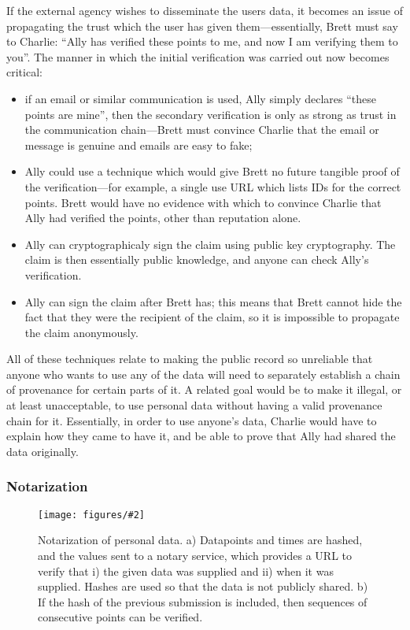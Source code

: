 \documentclass{IOS-Book-Article}     %
\newcommand{\fig}[3][0.9]{
\begin{figure}[tp]
\begin{center}
\texttt{[image: figures/\#2]}
\caption{#3}
\label{fig:#2}
\end{center}
\end{figure}
}
\begin{document}
If the external agency wishes to disseminate the users data, it becomes an issue
of propagating the trust which the user has given them---essentially, Brett must
say to Charlie: ``Ally has verified these points to me, and now I am
verifying them to you''. The manner in which the initial verification was carried out now becomes
critical:
\begin{itemize}
  \item if an email or similar communication is used, Ally simply declares
  ``these points are mine'', then the secondary verification is only as strong as
  trust in the communication chain---Brett must convince Charlie that the email
  or message is genuine and emails are easy to fake;
  \item Ally could use a technique which would give Brett no future tangible
  proof of the verification---for example, a single use URL which
  lists IDs for the correct points. Brett would have no evidence with which to
  convince Charlie that Ally had verified the points, other than reputation
  alone.
  \item Ally can cryptographicaly sign the claim using public key cryptography.
  The claim is then essentially public knowledge, and anyone can check Ally's verification.
  \item Ally can sign the claim after Brett has; this means that Brett cannot
  hide the fact that they were the recipient of the claim, so it is impossible
  to propagate the claim anonymously.
\end{itemize}

All of these techniques relate to making the public record so unreliable that
anyone who wants to use any of the data will need to separately establish a
chain of provenance for certain parts of it. A related goal would be to make it
illegal, or at least unacceptable, to use personal data without having a valid
provenance chain for it. Essentially, in order to use anyone's data, Charlie
would have to explain how they came to have it, and be able to prove that Ally
had shared the data originally.


\subsubsection{Notarization}
\fig{Notarization}{Notarization of personal data. a) Datapoints and times are
hashed, and the values sent to a notary service, which provides a URL to verify
that i) the given data was supplied and ii) when it was supplied. Hashes are
used so that the data is not publicly shared. b) If the hash of the previous
submission is included, then sequences of consecutive points can be verified.}
\end{document}
